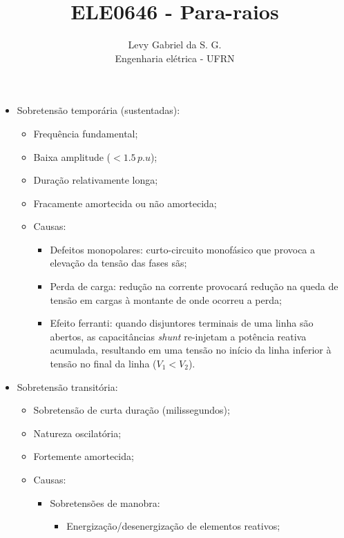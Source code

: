 \title{ELE0646 - Para-raios}
\author{Levy Gabriel da S. G. \\ Engenharia elétrica - UFRN}

\maketitle
\thispagestyle{fancy}

\begin{itemize}
    \item Sobretensão temporária (sustentadas):
    \begin{itemize}
        \item Frequência fundamental;
        \item Baixa amplitude ($<1.5 \, p.u$);
        \item Duração relativamente longa;
        \item Fracamente amortecida ou não amortecida;
        \item Causas:
        \begin{itemize}
            \item Defeitos monopolares: curto-circuito monofásico que provoca a elevação da tensão das fases sãs;
            \item Perda de carga: redução na corrente provocará redução na queda de tensão em cargas à montante de onde ocorreu a perda;
            \item Efeito ferranti: quando disjuntores terminais de uma linha são abertos, as capacitâncias \textit{shunt} re-injetam a potência reativa acumulada, resultando em uma tensão no início da linha inferior à tensão no final da linha ($V_1<V_2$).
        \end{itemize}
    \end{itemize}
    \item Sobretensão transitória:
    \begin{itemize}
        \item Sobretensão de curta duração (milissegundos);
        \item Natureza oscilatória;
        \item Fortemente amortecida;
        \item Causas:
        \begin{itemize}
            \item Sobretensões de manobra:
            \begin{itemize}
                \item Energização/desenergização de elementos reativos;

\end{itemize}
\end{itemize}
\end{itemize}
\end{itemize}

